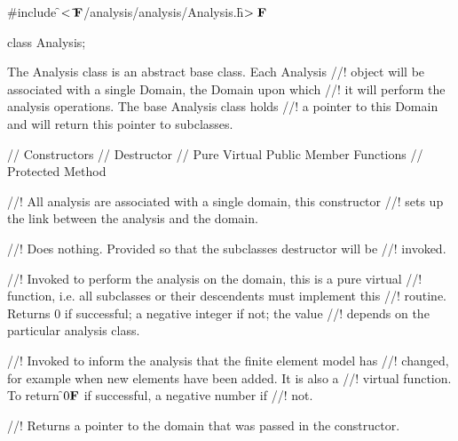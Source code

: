 
\indent \#include \f$<\tilde{ }{\bf F}$/analysis/analysis/Analysis.h\f$>{\bf F}$

\indent class Analysis;


\indent The Analysis class is an abstract base class. Each Analysis
//! object will be associated with a single Domain, the Domain upon which
//! it will perform the analysis operations. The base Analysis class holds
//! a pointer to this Domain and will return this pointer to subclasses.

\indent // Constructors
\indent // Destructor
\indent // Pure Virtual Public Member Functions 
\indent // Protected Method


//! All analysis are associated with a single domain, this constructor
//! sets up the link between the analysis and the domain.

//! Does nothing. Provided so that the subclasses destructor will be
//! invoked.

//! Invoked to perform the analysis on the domain, this is a pure virtual
//! function, i.e. all subclasses or their descendents must implement this
//! routine. Returns 0 if successful; a negative integer if not; the value
//! depends on the particular analysis class.

//! Invoked to inform the analysis that the finite element model has
//! changed, for example when new elements have been added. It is also a
//! virtual function. To return \f$0{\bf F}$ if successful, a negative number if
//! not. 

//! Returns a pointer to the domain that was passed in the constructor.




